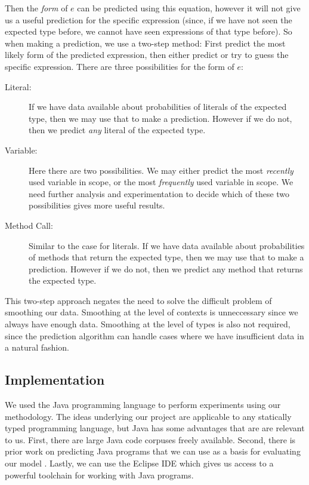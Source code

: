 \documentclass{article} %
\begin{document}
Then the \emph{form} of $e$ can be predicted using this equation, however it will not give us a useful prediction for the specific expression (since, if we have not seen the expected type before, we cannot have seen expressions of that type before). So when making a prediction, we use a two-step method: First predict the most likely form of the predicted expression, then either predict or try to guess the specific expression. There are three possibilities for the form of $e$:
\begin{description}
  \item[Literal:] If we have data available about probabilities of literals of the expected type, then we may use that to make a prediction. However if we do not, then we predict \emph{any} literal of the expected type.
  \item[Variable:] Here there are two possibilities. We may either predict the most \emph{recently} used variable in scope, or the most \emph{frequently} used variable in scope. We need further analysis and experimentation to decide which of these two possibilities gives more useful results.
  \item[Method Call:] Similar to the case for literals. If we have data available about probabilities of methods that return the expected type, then we may use that to make a prediction. However if we do not, then we predict any method that returns the expected type.
\end{description}

This two-step approach negates the need to solve the difficult problem of smoothing our data. Smoothing at the level of contexts is unneccessary since we always have enough data. Smoothing at the level of types is also not required, since the prediction algorithm can handle cases where we have insufficient data in a natural fashion.

\subsection*{Implementation}
We used the Java programming language to perform experiments using our methodology. The ideas underlying our project are applicable to any statically typed programming language, but Java has some advantages that are are relevant to us. First, there are large Java code corpuses freely available. Second, there is prior work on predicting Java programs that we can use as a basis for evaluating our model \cite{QualitasCorpus:APSEC:2010}. Lastly, we can use the Eclipse IDE which gives us access to a powerful toolchain for working with Java programs.
\end{document}
